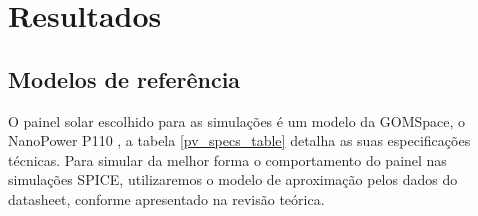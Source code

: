 \chapter{Resultados} \label{resultados}

\section{Modelos de referência}
O painel solar escolhido para as simulações é um modelo da GOMSpace, o NanoPower P110 \cite{pv_gomspace_datasheet}, a tabela \ref{pv_specs_table} detalha as suas especificações técnicas. Para simular da melhor forma o comportamento do painel nas simulações SPICE, utilizaremos o modelo de aproximação pelos dados do datasheet, conforme apresentado na revisão teórica.



\noindent
\begin{minipage}{\linewidth}
\label{fig:model_pv_circuit}
\end{minipage}

\noindent
\begin{minipage}{\linewidth}
\label{fig:model_pv_traces}
\end{minipage}

